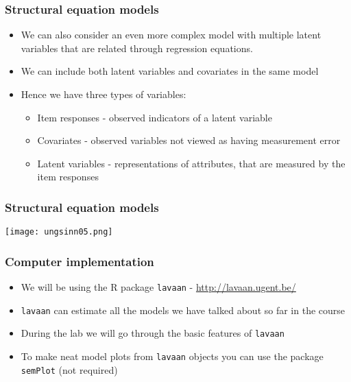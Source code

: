 \documentclass[compress]{beamer}
\let\code=\texttt
\begin{document}
\begin{frame}[fragile]
\frametitle{Structural equation models}
\begin{itemize}
\item We can also consider an even more complex model with multiple latent variables that are related through regression equations.
\item We can include both latent variables and covariates in the same model
\item Hence we have three types of variables:
\begin{itemize}
\item Item responses - observed indicators of a latent variable
\item Covariates - observed variables not viewed as having measurement error
\item Latent variables - representations of attributes, that are measured by the item responses
\end{itemize}
\end{itemize}
\end{frame}

\begin{frame}[fragile]
\frametitle{Structural equation models}
\texttt{[image: ungsinn05.png]}
\end{frame}


\begin{frame}[fragile]
\frametitle{Computer implementation}
\begin{itemize}
\item We will be using the R package \code{lavaan} - \url{http://lavaan.ugent.be/}
\item \code{lavaan} can estimate all the models we have talked about so far in the course
\item During the lab we will go through the basic features of \code{lavaan}
\item To make neat model plots from \code{lavaan} objects  you can use the package \code{semPlot} (not required)
\end{itemize}
\end{frame}


\end{document}
